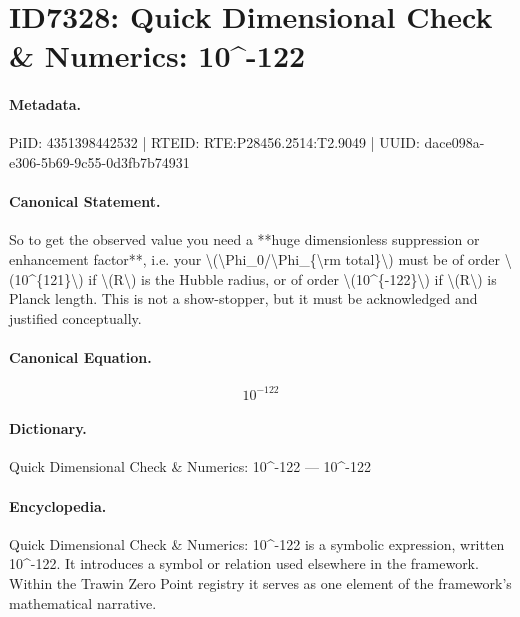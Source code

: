 \section*{ID7328: Quick Dimensional Check \& Numerics: 10\textasciicircum{}-122}
\paragraph{Metadata.}
PiID: 4351398442532 | RTEID: RTE:P28456.2514:T2.9049 | UUID: dace098a-e306-5b69-9c55-0d3fb7b74931

\paragraph{Canonical Statement.}
So to get the observed value you need a **huge dimensionless suppression or enhancement factor**, i.e. your \textbackslash{}(\textbackslash{}Phi\_0/\textbackslash{}Phi\_\{\textbackslash{}rm total\}\textbackslash{}) must be of order \textbackslash{}(10\textasciicircum{}\{121\}\textbackslash{}) if \textbackslash{}(R\textbackslash{}) is the Hubble radius, or of order \textbackslash{}(10\textasciicircum{}\{-122\}\textbackslash{}) if \textbackslash{}(R\textbackslash{}) is Planck length. This is not a show-stopper, but it must be acknowledged and justified conceptually.

\paragraph{Canonical Equation.}
\[
10^{-122}
\]

\paragraph{Dictionary.}
Quick Dimensional Check \& Numerics: 10\textasciicircum{}-122 — 10\textasciicircum{}-122

\paragraph{Encyclopedia.}
Quick Dimensional Check \& Numerics: 10\textasciicircum{}-122 is a symbolic expression, written 10\textasciicircum{}-122. It introduces a symbol or relation used elsewhere in the framework. Within the Trawin Zero Point registry it serves as one element of the framework's mathematical narrative.
